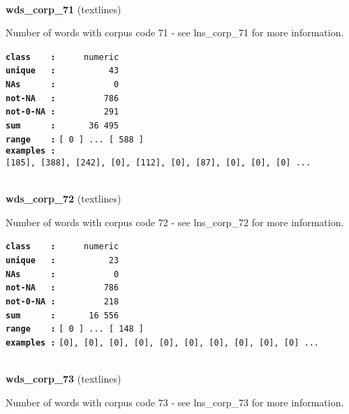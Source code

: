 \documentclass[]{article}
\begin{document}
~

\textbf{wds\_corp\_71} (textlines)

Number of words with corpus code 71 - see lns\_corp\_71 for more
information.

\textbf{\texttt{class\ \ \ \ :}} \texttt{~~~~~numeric}\\
\textbf{\texttt{unique\ \ \ :}} \texttt{~~~~~~~~~~43}\\
\textbf{\texttt{NAs\ \ \ \ \ \ :}} \texttt{~~~~~~~~~~~0}\\
\textbf{\texttt{not-NA\ \ \ :}} \texttt{~~~~~~~~~786}\\
\textbf{\texttt{not-0-NA\ :}} \texttt{~~~~~~~~~291}\\
\textbf{\texttt{sum\ \ \ \ \ \ :}} \texttt{~~~~~~36~495}\\
\textbf{\texttt{range\ \ \ \ :}}
\texttt{{[}\ 0\ {]}\ ...\ {[}\ 588\ {]}}\\
\textbf{\texttt{examples\ :}}
\texttt{{[}185{]},\ {[}388{]},\ {[}242{]},\ {[}0{]},\ {[}112{]},\ {[}0{]},\ {[}87{]},\ {[}0{]},\ {[}0{]},\ {[}0{]}\ ...}\\

~

\textbf{wds\_corp\_72} (textlines)

Number of words with corpus code 72 - see lns\_corp\_72 for more
information.

\textbf{\texttt{class\ \ \ \ :}} \texttt{~~~~~numeric}\\
\textbf{\texttt{unique\ \ \ :}} \texttt{~~~~~~~~~~23}\\
\textbf{\texttt{NAs\ \ \ \ \ \ :}} \texttt{~~~~~~~~~~~0}\\
\textbf{\texttt{not-NA\ \ \ :}} \texttt{~~~~~~~~~786}\\
\textbf{\texttt{not-0-NA\ :}} \texttt{~~~~~~~~~218}\\
\textbf{\texttt{sum\ \ \ \ \ \ :}} \texttt{~~~~~~16~556}\\
\textbf{\texttt{range\ \ \ \ :}}
\texttt{{[}\ 0\ {]}\ ...\ {[}\ 148\ {]}}\\
\textbf{\texttt{examples\ :}}
\texttt{{[}0{]},\ {[}0{]},\ {[}0{]},\ {[}0{]},\ {[}0{]},\ {[}0{]},\ {[}0{]},\ {[}0{]},\ {[}0{]},\ {[}0{]}\ ...}\\

~

\textbf{wds\_corp\_73} (textlines)

Number of words with corpus code 73 - see lns\_corp\_73 for more
information.
\end{document}
